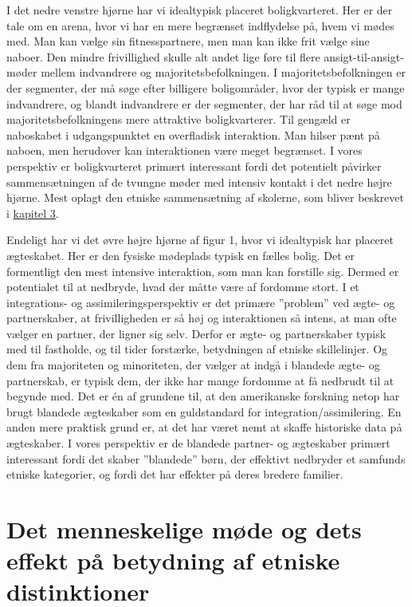 \documentclass[
]{book}
\begin{document}
I det nedre venstre hjørne har vi idealtypisk placeret boligkvarteret. Her er der tale om en arena, hvor vi har en mere begrænset indflydelse på, hvem vi mødes med. Man kan vælge sin fitnesspartnere, men man kan ikke frit vælge sine naboer. Den mindre frivillighed skulle alt andet lige føre til flere ansigt-til-ansigt-møder mellem indvandrere og majoritetsbefolkningen. I majoritetsbefolkningen er der segmenter, der må søge efter billigere boligområder, hvor der typisk er mange indvandrere, og blandt indvandrere er der segmenter, der har råd til at søge mod majoritetsbefolkningens mere attraktive boligkvarterer. Til gengæld er naboskabet i udgangspunktet en overfladisk interaktion. Man hilser pænt på naboen, men herudover kan interaktionen være meget begrænset. I vores perspektiv er boligkvarteret primært interessant fordi det potentielt påvirker sammensætningen af de tvungne møder med intensiv kontakt i det nedre højre hjørne. Mest oplagt den etniske sammensætning af skolerne, som bliver beskrevet i \hyperref[kap3]{kapitel 3}.

Endeligt har vi det øvre højre hjørne af figur 1, hvor vi idealtypisk har placeret ægteskabet. Her er den fysiske mødeplads typisk en fælles bolig. Det er formentligt den mest intensive interaktion, som man kan forstille sig. Dermed er potentialet til at nedbryde, hvad der måtte være af fordomme stort. I et integrations- og assimileringsperspektiv er det primære ''problem'' ved ægte- og partnerskaber, at frivilligheden er så høj og interaktionen så intens, at man ofte vælger en partner, der ligner sig selv. Derfor er ægte- og partnerskaber typisk med til fastholde, og til tider forstærke, betydningen af etniske skillelinjer. Og dem fra majoriteten og minoriteten, der vælger at indgå i blandede ægte- og partnerskab, er typisk dem, der ikke har mange fordomme at få nedbrudt til at begynde med. Det er én af grundene til, at den amerikanske forskning netop har brugt blandede ægteskaber som en guldstandard for integration/assimilering. En anden mere praktisk grund er, at det har været nemt at skaffe historiske data på ægteskaber. I vores perspektiv er de blandede partner- og ægteskaber primært interessant fordi det skaber ''blandede'' børn, der effektivt nedbryder et samfunds etniske kategorier, og fordi det har effekter på deres bredere familier.

\section{Det menneskelige møde og dets effekt på betydning af etniske distinktioner}\label{det-menneskelige-muxf8de-og-dets-effekt-puxe5-betydning-af-etniske-distinktioner}
\end{document}
